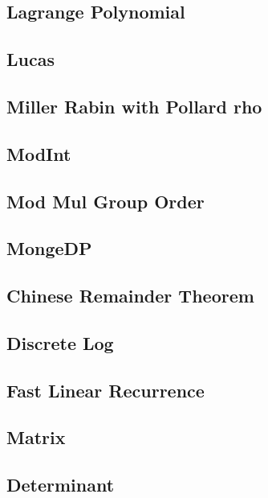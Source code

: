 \subsection{Lagrange Polynomial}

\subsection{Lucas}

%
\subsection{Miller Rabin with Pollard rho}

\subsection{ModInt}

\subsection{Mod Mul Group Order}

\subsection{MongeDP}

\subsection{Chinese Remainder Theorem}

\subsection{Discrete Log}

\subsection{Fast Linear Recurrence}

\subsection{Matrix}

\subsection{Determinant}

